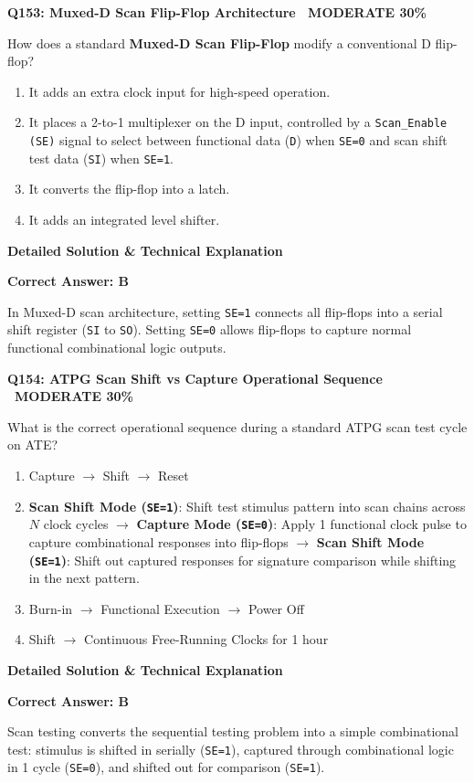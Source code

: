 \documentclass[11pt,a4paper]{article}
\newcommand{\badgemod}{{\color{white}\colorbox{modoran}{\bfseries\sffamily\tiny\ MODERATE 30\%\ }}}
\newenvironment{qbox}[2]{%
  \begin{mdframed}[style=qstyle]%
  {\bfseries\sffamily\color{primaryblue}#1 \hfill #2}\par\vspace{2pt}%
}{%
  \end{mdframed}%
}
\newenvironment{ansbox}{%
  \begin{mdframed}[style=ansstyle]%
  {\bfseries\sffamily\color{ansgreen}\small Detailed Solution \& Technical Explanation}\par\vspace{2pt}\small%
}{%
  \end{mdframed}%
}
\begin{document}
\begin{qbox}{Q153: Muxed-D Scan Flip-Flop Architecture}{\badgemod}
How does a standard \textbf{Muxed-D Scan Flip-Flop} modify a conventional D flip-flop?
\begin{enumerate}[label=\textbf{\Alph*.}]
  \item It adds an extra clock input for high-speed operation.
  \item It places a 2-to-1 multiplexer on the D input, controlled by a \texttt{Scan\_Enable (SE)} signal to select between functional data (\texttt{D}) when \texttt{SE=0} and scan shift test data (\texttt{SI}) when \texttt{SE=1}.
  \item It converts the flip-flop into a latch.
  \item It adds an integrated level shifter.
\end{enumerate}
\end{qbox}
\begin{ansbox}
\textbf{Correct Answer: B}

In Muxed-D scan architecture, setting \texttt{SE=1} connects all flip-flops into a serial shift register (\texttt{SI} to \texttt{SO}). Setting \texttt{SE=0} allows flip-flops to capture normal functional combinational logic outputs.
\end{ansbox}

\begin{qbox}{Q154: ATPG Scan Shift vs Capture Operational Sequence}{\badgemod}
What is the correct operational sequence during a standard ATPG scan test cycle on ATE?
\begin{enumerate}[label=\textbf{\Alph*.}]
  \item Capture $\rightarrow$ Shift $\rightarrow$ Reset
  \item \textbf{Scan Shift Mode (\texttt{SE=1})}: Shift test stimulus pattern into scan chains across $N$ clock cycles $\rightarrow$ \textbf{Capture Mode (\texttt{SE=0})}: Apply 1 functional clock pulse to capture combinational responses into flip-flops $\rightarrow$ \textbf{Scan Shift Mode (\texttt{SE=1})}: Shift out captured responses for signature comparison while shifting in the next pattern.
  \item Burn-in $\rightarrow$ Functional Execution $\rightarrow$ Power Off
  \item Shift $\rightarrow$ Continuous Free-Running Clocks for 1 hour
\end{enumerate}
\end{qbox}
\begin{ansbox}
\textbf{Correct Answer: B}

Scan testing converts the sequential testing problem into a simple combinational test: stimulus is shifted in serially (\texttt{SE=1}), captured through combinational logic in 1 cycle (\texttt{SE=0}), and shifted out for comparison (\texttt{SE=1}).
\end{ansbox}
\end{document}
